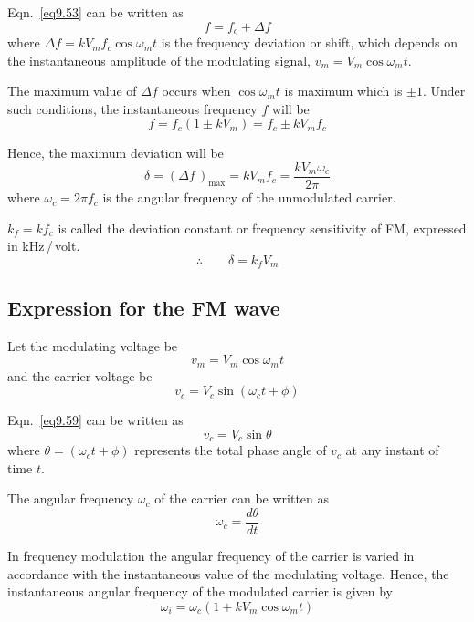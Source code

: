 Eqn.~\eqref{eq9.53} can be written as
\begin{equation}
f=f_{c}+\Delta f\label{eq9.54}
\end{equation}
where $\Delta f=kV_{m}f_{c}\cos \omega_{m}t$ is the frequency deviation or shift, which depends on the instantaneous amplitude of the modulating signal, $v_{m}=V_{m}\cos \omega_{m}t$.

The maximum value of $\Delta f$ occurs when $\cos \omega_{m}t$ is maximum which is $\pm 1$. Under such conditions, the instantaneous frequency $f$ will be
\begin{equation}
f=f_{c}(1\pm kV_{m})=f_{c}\pm kV_{m}f_{c}\label{eq9.55}
\end{equation}

Hence, the maximum deviation will be
\begin{equation}
\delta = (\Delta f\,)_{\max}=kV_{m}f_{c}=\frac{kV_{m}\omega_{c}}{2\pi}\label{eq9.56}
\end{equation}
where $\omega_{c}=2\pi f_{c}$ is the angular frequency of the unmodulated carrier.

$k_{f}=kf_{c}$ is called the deviation constant or frequency sensitivity of FM, expressed in kHz\,/\,volt.
\begin{equation}
\therefore\qquad \delta=k_{f}V_{m}\label{eq9.57}
\end{equation}

\subsection{Expression for the FM wave}\label{sec9.18.4}

Let the modulating voltage be
\begin{equation}
v_{m}=V_{m}\cos \omega_{m}t\label{eq9.58}
\end{equation}
and the carrier voltage be
\begin{equation}
v_{c}=V_{c}\sin (\omega_{c}t+\phi)\label{eq9.59}
\end{equation}

Eqn.~\eqref{eq9.59} can be written as
\begin{equation}
v_{c}=V_{c}\sin \theta\label{eq9.60}
\end{equation}
where $\theta=(\omega_{c}t+\phi)$ represents the total phase angle of $v_{c}$ at any instant of time $t$.

The angular frequency $\omega_{c}$ of the carrier can be written as
$$
\omega_{c}=\dfrac{d\theta}{dt}
$$

In frequency modulation the angular frequency of the carrier is varied in accordance with the instantaneous value of the modulating voltage. Hence, the instantaneous angular frequency of the modulated carrier is given by
\begin{equation}
\omega_{i}=\omega_{c}(1+kV_{m}\cos \omega_{m}t)\label{eq9.61}
\end{equation}

